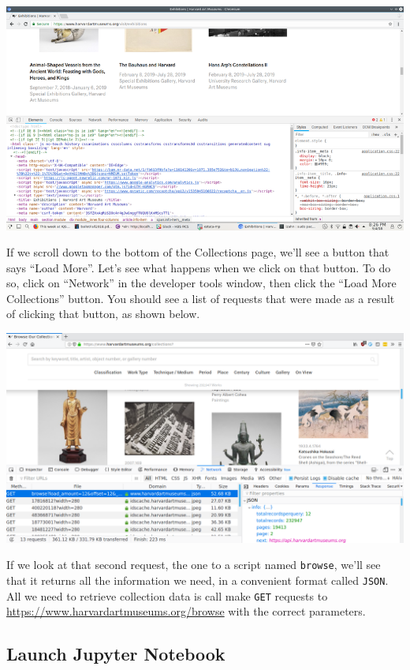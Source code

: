 \documentclass[]{book}
\begin{document}
\includegraphics{Python/PythonWebScrape/images/dev_tools_pane.png}

If we scroll down to the bottom of the Collections page, we'll see a
button that says ``Load More''. Let's see what happens when we click on
that button. To do so, click on ``Network'' in the developer tools
window, then click the ``Load More Collections'' button. You should see
a list of requests that were made as a result of clicking that button,
as shown below.

\includegraphics{Python/PythonWebScrape/images/dev_tools_network.png}

If we look at that second request, the one to a script named
\texttt{browse}, we'll see that it returns all the information we need, in
a convenient format called \texttt{JSON}. All we need to retrieve collection
data is call make \texttt{GET} requests to
\url{https://www.harvardartmuseums.org/browse} with the correct
parameters.

\hypertarget{launch-jupyter-notebook-1}{%
\subsection{Launch Jupyter Notebook}\label{launch-jupyter-notebook-1}}
\end{document}
